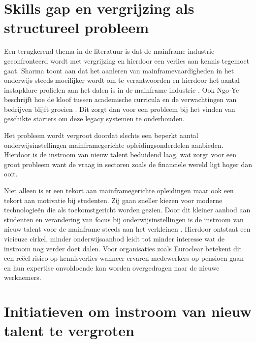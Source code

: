 \section{Skills gap en vergrijzing als structureel probleem}%
\label{sec:skills_gap_vergrijzing}

Een terugkerend thema in de literatuur is dat de mainframe industrie geconfronteerd wordt met vergrijzing en hierdoor een verlies aan kennis tegemoet gaat. 
Sharma toont aan dat het aanleren van mainframevaardigheden in het onderwijs steeds moeilijker wordt om te verantwoorden en hierdoor het aantal instapklare profielen aan het dalen is in de mainframe industrie \autocite{Sharma2011TeachOrNotTeach}.
Ook Ngo-Ye beschrijft hoe de kloof tussen academische curricula en de verwachtingen van bedrijven blijft groeien \autocite{NgoYe2018TeachingMainframeSkills}.
Dit zorgt dan voor een probleem bij het vinden van geschikte starters om deze legacy systemen te onderhouden.

Het probleem wordt vergroot doordat slechts een beperkt aantal onderwijsinstellingen mainframegerichte opleidingsonderdelen aanbieden.
Hierdoor is de instroom van nieuw talent beduidend laag, wat zorgt voor een groot probleem want de vraag in sectoren zoals de financiële wereld ligt hoger dan ooit.

Niet alleen is er een tekort aan mainframegerichte opleidingen maar ook een tekort aan motivatie bij studenten.
Zij gaan sneller kiezen voor moderne technologieën die als toekomstgericht worden gezien.
Door dit kleiner aanbod aan studenten en verandering van focus bij onderwijsinstellingen is de instroom van nieuw talent voor de mainframe steeds aan het verkleinen \autocite{Phillips2013Mainframe}.
Hierdoor ontstaat een vicieuze cirkel, minder onderwijsaanbod leidt tot minder interesse wat de instroom nog verder doet dalen. 
Voor organisaties zoals Euroclear betekent dit een reëel risico op kennisverlies wanneer ervaren medewerkers op pensioen gaan en hun expertise onvoldoende kan worden overgedragen naar de nieuwe werknemers.


\section{Initiatieven om instroom van nieuw talent te vergroten}%
\label{sec:instroom_initiatieven}

